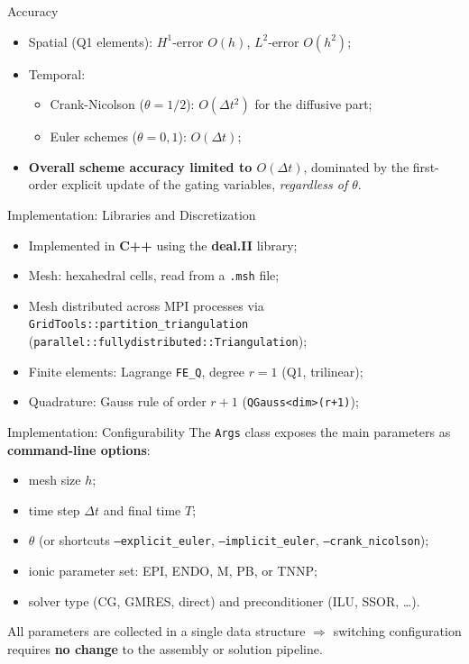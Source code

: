 \documentclass{beamer}
\begin{document}
\begin{frame}{Accuracy}
\begin{itemize}
  \item Spatial (Q1 elements): $H^1$-error $O(h)$, $L^2$-error $O(h^2)$;
  \item Temporal:
  \begin{itemize}
    \item Crank-Nicolson ($\theta=1/2$): $O(\Delta t^2)$ for the diffusive part;
    \item Euler schemes ($\theta=0,1$): $O(\Delta t)$;
  \end{itemize}
  \item \textbf{Overall scheme accuracy limited to $O(\Delta t)$}, dominated by the
        first-order explicit update of the gating variables, \emph{regardless of $\theta$}.
\end{itemize}
\end{frame}




\begin{frame}{Implementation: Libraries and Discretization}
\begin{itemize}
  \item Implemented in \textbf{C++} using the \textbf{deal.II} library;
  \item Mesh: hexahedral cells, read from a \texttt{.msh} file;
  \item Mesh distributed across MPI processes via
        \texttt{GridTools::partition\_triangulation}
        (\texttt{parallel::fullydistributed::Triangulation});
  \item Finite elements: Lagrange \texttt{FE\_Q}, degree $r=1$ (Q1,
        trilinear);
  \item Quadrature: Gauss rule of order $r+1$
        (\texttt{QGauss<dim>(r+1)});
\end{itemize}
\end{frame}


\begin{frame}{Implementation: Configurability}
The \texttt{Args} class exposes the main parameters as
\textbf{command-line options}:
\begin{itemize}
  \item mesh size $h$;
  \item time step $\Delta t$ and final time $T$;
  \item $\theta$ (or shortcuts \texttt{--explicit\_euler},
        \texttt{--implicit\_euler}, \texttt{--crank\_nicolson});
  \item ionic parameter set: EPI, ENDO, M, PB, or TNNP;
  \item solver type (CG, GMRES, direct) and preconditioner
        (ILU, SSOR, \ldots).
\end{itemize}
\vspace{6pt}
All parameters are collected in a single data structure $\Rightarrow$
switching configuration requires \textbf{no change} to the assembly or
solution pipeline.
\end{frame}
\end{document}
